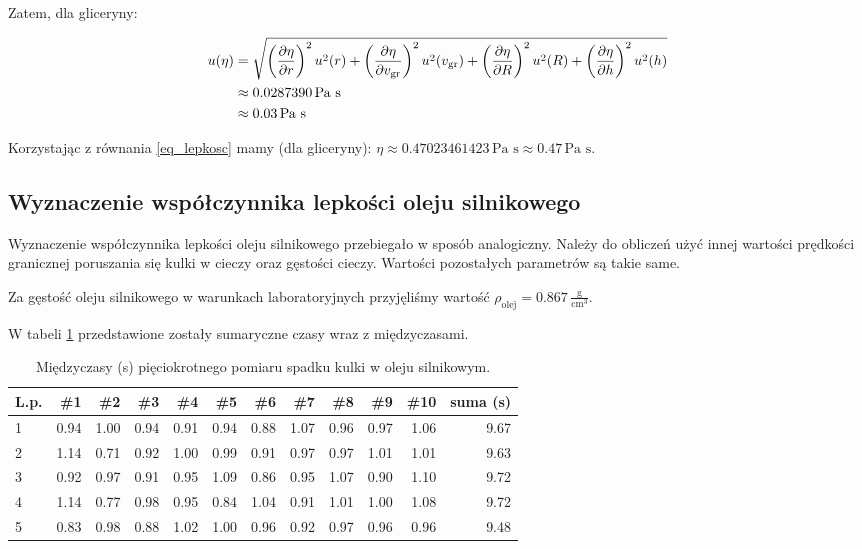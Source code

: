 \documentclass[a4paper]{article}
\begin{document}
Zatem, dla gliceryny:

\begin{align*}
	u(\eta) &= \sqrt{
	  \left(\frac{\partial \eta}{\partial r}\right)^2 u^2(r)
	+ \left(\frac{\partial \eta}{\partial v_{\text{gr}}}\right)^2 u^2(v_{\text{gr}})
	+ \left(\frac{\partial \eta}{\partial R}\right)^2 u^2(R)
	+ \left(\frac{\partial \eta}{\partial h}\right)^2 u^2(h)
	} \\
	&\approx 0.0287390 \, \text{Pa s}\\
	&\approx 0.03 \, \text{Pa s}
\end{align*}

Korzystając z równania \ref{eq_lepkosc} mamy (dla gliceryny): $\eta \approx 0.47023461423 \, \text{Pa s} \approx 0.47 \, \text {Pa s}$.

\subsection{Wyznaczenie współczynnika lepkości oleju silnikowego}

Wyznaczenie współczynnika lepkości oleju silnikowego przebiegało w sposób analogiczny.
Należy do obliczeń użyć innej wartości prędkości granicznej poruszania się kulki w cieczy oraz gęstości cieczy.
Wartości pozostałych parametrów są takie same.

Za gęstość oleju silnikowego w warunkach laboratoryjnych przyjęliśmy wartość $\rho_\text{olej} = 0.867 \, \frac{\text{g}}{\text{cm}^3}$.

W tabeli \ref{olej} przedstawione zostały sumaryczne czasy wraz z międzyczasami.

\begin{table}[h!]
	\centering
	\begin{tabular}{lrrrrrrrrrrr}
		\toprule
		L.p. &  \#1 &  \#2 &  \#3 &  \#4 &  \#5 &  \#6 &  \#7 &  \#8 &  \#9 &  \#10 & suma (s)\\
		\midrule
		1 &           0.94 &           1.00 &           0.94 &           0.91 &           0.94 &           0.88 &           1.07 &           0.96 &           0.97 &            1.06 & 9.67 \\
		2 &           1.14 &           0.71 &           0.92 &           1.00 &           0.99 &           0.91 &           0.97 &           0.97 &           1.01 &            1.01 & 9.63 \\
		3 &           0.92 &           0.97 &           0.91 &           0.95 &           1.09 &           0.86 &           0.95 &           1.07 &           0.90 &            1.10 & 9.72 \\
		4 &           1.14 &           0.77 &           0.98 &           0.95 &           0.84 &           1.04 &           0.91 &           1.01 &           1.00 &            1.08 & 9.72 \\
		5 &           0.83 &           0.98 &           0.88 &           1.02 &           1.00 &           0.96 &           0.92 &           0.97 &           0.96 &            0.96 & 9.48 \\
		\bottomrule
		\end{tabular}
	\caption{Międzyczasy (s) pięciokrotnego pomiaru spadku kulki w oleju silnikowym.}
	\label{olej}
\end{table}
\end{document}
